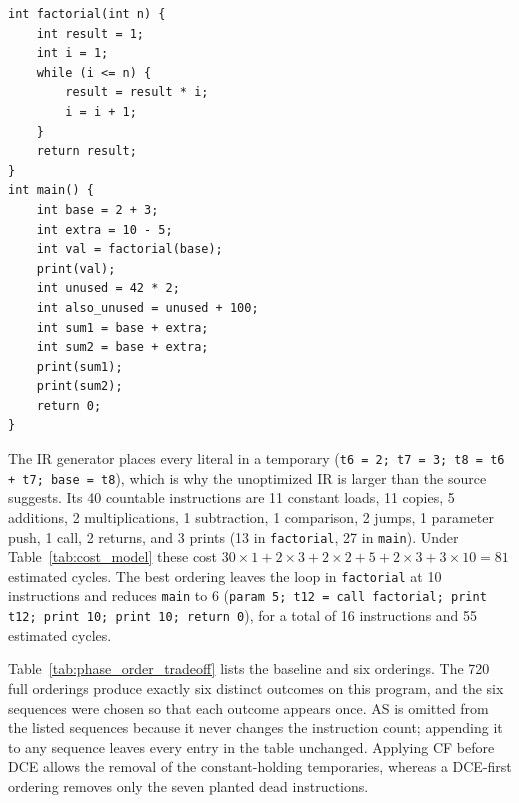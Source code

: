 \documentclass[conference]{IEEEtran}
\begin{document}
\begin{lstlisting}[basicstyle=\ttfamily\scriptsize,caption={The \texttt{factorial} benchmark (comments removed).},label={lst:factorial}]
int factorial(int n) {
    int result = 1;
    int i = 1;
    while (i <= n) {
        result = result * i;
        i = i + 1;
    }
    return result;
}
int main() {
    int base = 2 + 3;
    int extra = 10 - 5;
    int val = factorial(base);
    print(val);
    int unused = 42 * 2;
    int also_unused = unused + 100;
    int sum1 = base + extra;
    int sum2 = base + extra;
    print(sum1);
    print(sum2);
    return 0;
}
\end{lstlisting}

The IR generator places every literal in a temporary (\texttt{t6 = 2; t7 = 3; t8 = t6 + t7; base = t8}), which is why the unoptimized IR is larger than the source suggests. Its 40 countable instructions are 11 constant loads, 11 copies, 5 additions, 2 multiplications, 1 subtraction, 1 comparison, 2 jumps, 1 parameter push, 1 call, 2 returns, and 3 prints (13 in \texttt{factorial}, 27 in \texttt{main}). Under Table~\ref{tab:cost_model} these cost $30 \times 1 + 2 \times 3 + 2 \times 2 + 5 + 2 \times 3 + 3 \times 10 = 81$ estimated cycles. The best ordering leaves the loop in \texttt{factorial} at 10 instructions and reduces \texttt{main} to 6 (\texttt{param 5; t12 = call factorial; print t12; print 10; print 10; return 0}), for a total of 16 instructions and 55 estimated cycles.

Table~\ref{tab:phase_order_tradeoff} lists the baseline and six orderings. The 720 full orderings produce exactly six distinct outcomes on this program, and the six sequences were chosen so that each outcome appears once. AS is omitted from the listed sequences because it never changes the instruction count; appending it to any sequence leaves every entry in the table unchanged. Applying CF before DCE allows the removal of the constant-holding temporaries, whereas a DCE-first ordering removes only the seven planted dead instructions.
\end{document}
